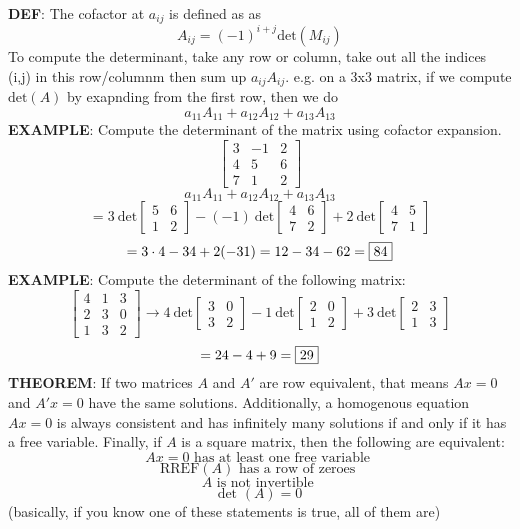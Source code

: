 \documentclass[letterpaper]{report}
\begin{document}
   \textbf{DEF}: The cofactor at $a_{ij}$ is defined as as 
   \[
       A_{ij} = (-1)^{i+j} \text{det}(M_{ij})
   \] 
   To compute the determinant, take any row or column, take out all the indices (i,j) in this row/columnm then sum up $a_{ij}A_{ij}$. e.g. on a 3x3 matrix, if we compute $\text{det}(A)$ by exapnding from the first row, then we do 
   \[
       a_{11}A_{11} + a_{12}A_{12} + a_{13}A_{13}
   \] 
\textbf{EXAMPLE}: Compute the determinant of the matrix using cofactor expansion. 
\[
\begin{bmatrix} 
    3 & -1 & 2 \\
    4 & 5 & 6 \\
    7 & 1 & 2
\end{bmatrix} 
\] 
\[
    a_{11}A_{11} + a_{12}A_{12} + a_{13}A_{13}
\] 
\[
    = 3\ \text{det}\begin{bmatrix} 
        5 & 6 \\
        1 & 2
    \end{bmatrix} - (-1) \ \text{det}
    \begin{bmatrix} 
        4 & 6 \\
        7 & 2
    \end{bmatrix} + 2 \ \text{det}
    \begin{bmatrix} 
        4 &5 \\
        7 & 1
    \end{bmatrix} 
\] 
\[
    = 3 \cdot 4 - 34 +2(-31) = 12 - 34 - 62  = \fbox{84}
\] 
\textbf{EXAMPLE}: Compute the determinant of the following matrix: 
\[
\begin{bmatrix} 
    4 & 1 & 3 \\
2 & 3 & 0  \\
1 & 3 & 2 
\end{bmatrix} \to
4\ \text{det}
\begin{bmatrix} 
    3 & 0 \\
    3 & 2 
\end{bmatrix} - 1\ \text{det}
\begin{bmatrix} 
    2 & 0 \\
    1 & 2 
\end{bmatrix} + 3\ \text{det}
\begin{bmatrix} 
    2 & 3 \\
    1 & 3 
\end{bmatrix}  \] 
\[
= 24-4+9 = \fbox{29}
\] 
\textbf{THEOREM}: If two matrices $A$ and $A'$ are row equivalent, that means $Ax = 0$ and $A'x = 0$ have the same solutions. Additionally, a homogenous equation $Ax = 0$ is always consistent and has infinitely many solutions if and only if it has a free variable. Finally, if $A$ is a square matrix, then the following are equivalent: 
\[
    Ax = 0 \text{ has at least one free variable }
\] 
\[
    \text{RREF}(A) \text{ has a row of zeroes }
\] 
\[
    A \text{ is not invertible }
\] 
\[
    \text{det }(A) = 0 
\] 
(basically, if you know one of these statements is true, all of them are)
\end{document}
